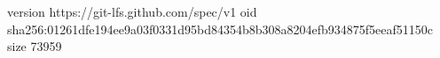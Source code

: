 version https://git-lfs.github.com/spec/v1
oid sha256:01261dfe194ee9a03f0331d95bd84354b8b308a8204efb934875f5eeaf51150c
size 73959
